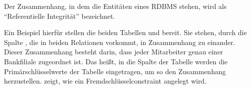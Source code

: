         \begin{merke}
          Der Zusammenhang, in dem die Entitäten eines RDBMS stehen, wird als \enquote{Referentielle Integrität} bezeichnet.
        \end{merke}
        Ein Beispiel hierfür stellen die beiden Tabellen  und  bereit. Sie stehen, durch die Spalte , die in beiden Relationen vorkommt, in Zusammenhang zu einander. Dieser Zusammenhang besteht darin, dass jeder Mitarbeiter genau einer Bankfiliale zugeordnet ist. Das heißt,  in die Spalte  der Tabelle  werden die Primärschlüsselwerte der Tabelle  eingetragen, um so den Zusammenhang herzustellen.
         zeigt, wie ein Fremdschlüsselconstraint angelegt wird.

